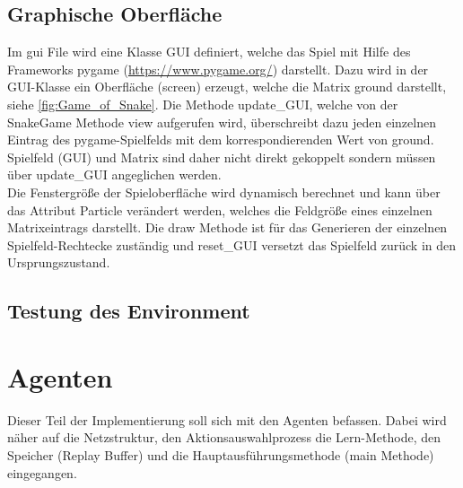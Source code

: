 \subsection{Graphische Oberfläche}
Im gui File wird eine Klasse GUI definiert, welche das Spiel mit Hilfe des Frameworks pygame (\url{https://www.pygame.org/}) darstellt. Dazu wird in der GUI-Klasse ein Oberfläche (screen) erzeugt, welche die Matrix ground darstellt, siehe \ref{fig:Game_of_Snake}. 
Die Methode update\_GUI, welche von der SnakeGame Methode view aufgerufen wird, überschreibt dazu jeden einzelnen Eintrag des pygame-Spielfelds mit dem korrespondierenden Wert von ground. 
Spielfeld (GUI) und Matrix sind daher nicht direkt gekoppelt sondern müssen über update\_GUI angeglichen werden.\\
Die Fenstergröße der Spieloberfläche wird dynamisch berechnet und kann über das Attribut Particle verändert werden, welches die Feldgröße eines einzelnen Matrixeintrags darstellt. 
Die draw Methode ist für das Generieren der einzelnen Spielfeld-Rechtecke zuständig und reset\_GUI versetzt das Spielfeld zurück in den Ursprungszustand.

\subsection{Testung des Environment}


\section{Agenten}
Dieser Teil der Implementierung soll sich mit den Agenten befassen. Dabei wird näher auf die Netzstruktur, den Aktionsauswahlprozess die Lern-Methode, den Speicher (Replay Buffer) und die Hauptausführungsmethode (main Methode) eingegangen.

